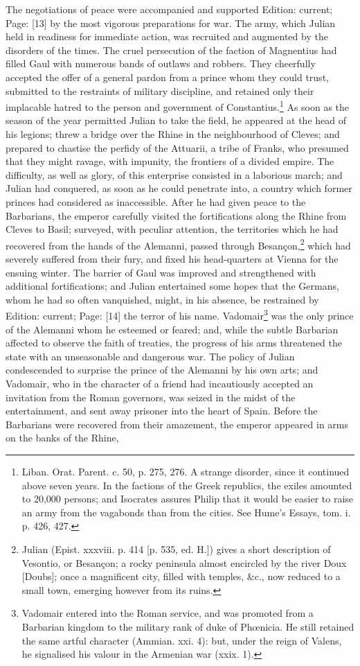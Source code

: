 The negotiations of peace were accompanied and supported Edition: current; Page: [13] by the most vigorous preparations for war. The army, which Julian held in readiness for immediate action, was recruited and augmented by the disorders of the times. The cruel persecution of the faction of Magnentius had filled Gaul with numerous bands of outlaws and robbers. They cheerfully accepted the offer of a general pardon from a prince whom they could trust, submitted to the restraints of military discipline, and retained only their implacable hatred to the person and government of Constantius.\footnote{Liban. Orat. Parent. c. 50, p. 275, 276. A strange disorder, since it continued above seven years. In the factions of the Greek republics, the exiles amounted to 20,000 persons; and Isocrates assures Philip that it would be easier to raise an army from the vagabonds than from the cities. See Hume\texthebrew{}’s Essays, tom. i. p. 426, 427.} As soon as the season of the year permitted Julian to take the field, he appeared at the head of his legions; threw a bridge over the Rhine in the neighbourhood of Cleves; and prepared to chastise the perfidy of the Attuarii, a tribe of Franks, who presumed that they might ravage, with impunity, the frontiers of a divided empire. The difficulty, as well as glory, of this enterprise consisted in a laborious march; and Julian had conquered, as soon as he could penetrate into, a country which former princes had considered as inaccessible. After he had given peace to the Barbarians, the emperor carefully visited the fortifications along the Rhine from Cleves to Basil; surveyed, with peculiar attention, the territories which he had recovered from the hands of the Alemanni, passed through Besançon,\footnote{Julian (Epist. xxxviii. p. 414 [p. 535, ed. H.]) gives a short description of Vesontio, or Besançon; a rocky peninsula almost encircled by the river Doux [Doubs]; once a magnificent city, filled with temples, \&c., now reduced to a small town, emerging however from its ruins.} which had severely suffered from their fury, and fixed his head-quarters at Vienna for the ensuing winter. The barrier of Gaul was improved and strengthened with additional fortifications; and Julian entertained some hopes that the Germans, whom he had so often vanquished, might, in his absence, be restrained by Edition: current; Page: [14] the terror of his name. Vadomair\footnote{Vadomair entered into the Roman service, and was promoted from a Barbarian kingdom to the military rank of duke of Phœnicia. He still retained the same artful character (Ammian. xxi. 4): but, under the reign of Valens, he signalised his valour in the Armenian war (xxix. 1).} was the only prince of the Alemanni whom he esteemed or feared; and, while the subtle Barbarian affected to observe the faith of treaties, the progress of his arms threatened the state with an unseasonable and dangerous war. The policy of Julian condescended to surprise the prince of the Alemanni by his own arts; and Vadomair, who in the character of a friend had incautiously accepted an invitation from the Roman governors, was seized in the midst of the entertainment, and sent away prisoner into the heart of Spain. Before the Barbarians were recovered from their amazement, the emperor appeared in arms on the banks of the Rhine, 